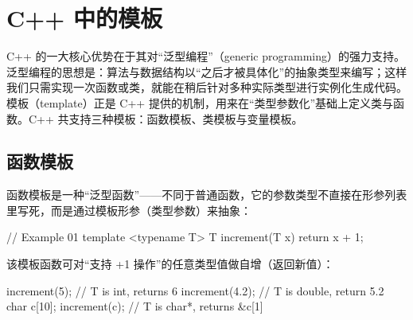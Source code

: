 \section{C++ 中的模板}

C++ 的一大核心优势在于其对“泛型编程”（generic programming）的强力支持。泛型编程的思想是：算法与数据结构以“之后才被具体化”的抽象类型来编写；这样我们只需实现一次函数或类，就能在稍后针对多种实际类型进行实例化生成代码。模板（template）正是 C++ 提供的机制，用来在“类型参数化”基础上定义类与函数。C++ 共支持三种模板：函数模板、类模板与变量模板。

\subsection{函数模板}

函数模板是一种“泛型函数”——不同于普通函数，它的参数类型不直接在形参列表里写死，而是通过模板形参（类型参数）来抽象：

\begin{code}
// Example 01
template <typename T>
T increment(T x) { return x + 1; }
\end{code}

该模板函数可对“支持 +1 操作”的任意类型值做自增（返回新值）：

\begin{code}
increment(5);    // T is int, returns 6
increment(4.2);    // T is double, return 5.2 char c[10];
increment(c);    // T is char*, returns &c[1]
\end{code}

